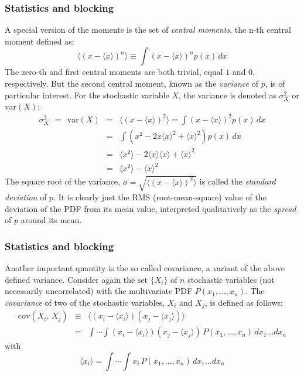 \documentclass{beamer}
\begin{document}
\begin{frame}
\frametitle{Statistics and blocking}

\begin{block}{}
A special version of the moments is the set of \emph{central moments},
the n-th central moment defined as:
\[
\langle (x-\langle x \rangle )^n\rangle \equiv \int\! (x-\langle x\rangle)^n p(x)\,dx
\]
The zero-th and first central moments are both trivial, equal $1$ and
$0$, respectively. But the second central moment, known as the
\emph{variance} of $p$, is of particular interest. For the stochastic
variable $X$, the variance is denoted as $\sigma^2_X$ or $\mathrm{var}(X)$:
\begin{eqnarray}
\sigma^2_X\ \ =\ \ \mathrm{var}(X) & = & \langle (x-\langle x\rangle)^2\rangle =
\int\! (x-\langle x\rangle)^2 p(x)\,dx\\
& = & \int\! \left(x^2 - 2 x \langle x\rangle^{2} +
  \langle x\rangle^2\right)p(x)\,dx\\
& = & \langle x^2\rangle - 2 \langle x\rangle\langle x\rangle + \langle x\rangle^2\\
& = & \langle x^2\rangle - \langle x\rangle^2
\end{eqnarray}
The square root of the variance, $\sigma =\sqrt{\langle (x-\langle x\rangle)^2\rangle}$ is called the \emph{standard deviation} of $p$. It is clearly just the RMS (root-mean-square)
value of the deviation of the PDF from its mean value, interpreted
qualitatively as the \emph{spread} of $p$ around its mean.
\end{block}
\end{frame}

\begin{frame}
\frametitle{Statistics and blocking}

\begin{block}{}
Another important quantity is the so called covariance, a variant of
the above defined variance. Consider again the set $\{X_i\}$ of $n$
stochastic variables (not necessarily uncorrelated) with the
multivariate PDF $P(x_1,\dots,x_n)$. The \emph{covariance} of two
of the stochastic variables, $X_i$ and $X_j$, is defined as follows:
\begin{eqnarray}
\mathrm{cov}(X_i,\,X_j) &\equiv& \langle (x_i-\langle x_i\rangle)(x_j-\langle x_j\rangle)\rangle
\nonumber\\
&=&
\int\!\cdots\!\int\!(x_i-\langle x_i \rangle)(x_j-\langle x_j \rangle)\,
P(x_1,\dots,x_n)\,dx_1\dots dx_n
\label{eq:def_covariance}
\end{eqnarray}
with
\[
\langle x_i\rangle =
\int\!\cdots\!\int\!x_i\,P(x_1,\dots,x_n)\,dx_1\dots dx_n
\]
\end{block}
\end{frame}
\end{document}
